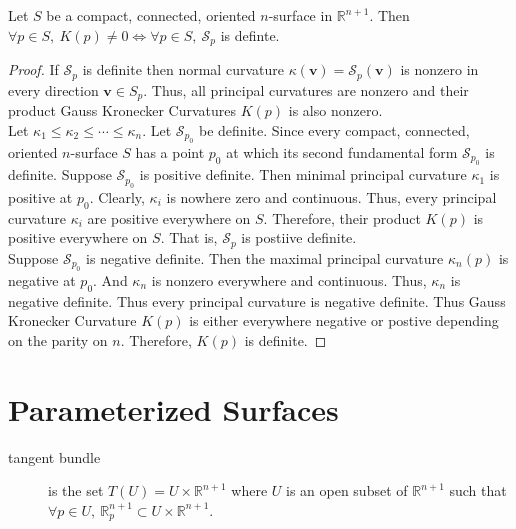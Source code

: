 \begin{theorem}
	Let $S$ be a compact, connected, oriented $n$-surface in $\mathbb{R}^{n+1}$.
	Then $\forall p \in S,\ K(p) \ne 0 \iff \forall p \in S,\ \mathscr{S}_p$ is definte.
\end{theorem}
\begin{proof}
	If $\mathscr{S}_p$ is definite then normal curvature $\kappa(\boldsymbol{v}) = \mathscr{S}_p(\boldsymbol{v})$ is nonzero in every direction $\boldsymbol{v} \in S_p$.
	Thus, all principal curvatures are nonzero and their product Gauss Kronecker Curvatures $K(p)$ is also nonzero.\\


	Let $\kappa_1 \le \kappa_2 \le \dotsb \le \kappa_n$.
	Let $\mathscr{S}_{p_0}$ be definite.
	Since every compact, connected, oriented $n$-surface $S$ has a point $p_0$ at which its second fundamental form $\mathscr{S}_{p_0}$ is definite.
	Suppose $\mathscr{S}_{p_0}$ is positive definite.
	Then minimal principal curvature $\kappa_1$ is positive at $p_0$.
	Clearly, $\kappa_i$ is nowhere zero and continuous.
	Thus, every principal curvature $\kappa_i$ are positive everywhere on $S$.
	Therefore, their product $K(p)$ is positive everywhere on $S$.
	That is, $\mathscr{S}_p$ is postiive definite.\\


	Suppose $\mathscr{S}_{p_0}$ is negative definite.
	Then the maximal principal curvature $\kappa_n(p)$ is negative at $p_0$.
	And $\kappa_n$ is nonzero everywhere and continuous.
	Thus, $\kappa_n$ is negative definite.
	Thus every principal curvature is negative definite.
	Thus Gauss Kronecker Curvature $K(p)$ is either everywhere negative or postive depending on the parity on $n$.
	Therefore, $K(p)$ is definite.
\end{proof}
\setcounter{section}{13}
\section{Parameterized Surfaces}
\begin{description}
	\item[tangent bundle] is the set $T(U) = U \times \mathbb{R}^{n+1}$ where $U$ is an open subset of $\mathbb{R}^{n+1}$ such that $\forall p \in U,\ \mathbb{R}_p^{n+1} \subset U \times \mathbb{R}^{n+1}$.
\end{description}

